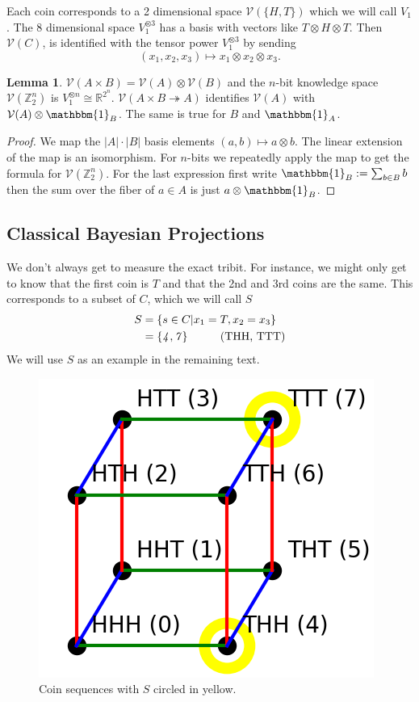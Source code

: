 \documentclass[12pt,a4paper]{article}
\theoremstyle{myrule}
\theoremstyle{postulate}
\theoremstyle{definition}
\newtheorem{lemma}[theorem]{Lemma}
\begin{document}
Each coin corresponds to a 2 dimensional space $\mathcal{V}(\{H,T\})$ which we will call $V_1$.  The 8 dimensional space $V_1 ^ {\otimes 3}$ has a basis with vectors like $T \otimes H \otimes T$.  Then $\mathcal{V}(C)$, is identified with the tensor power $V_1^{\otimes 3}$ by sending
\[
(x_1,x_2,x_3) \mapsto x_1 \otimes x_2 \otimes x_3.
\]

\begin{lemma}
\label{product}
  $\mathcal{V}(A \times B) = \mathcal{V}(A) \otimes \mathcal{V}(B)$ and the $n$-bit knowledge space $\mathcal{V}(\mathbb{Z}_2^n)$ is $V_1 ^ {\otimes n} \cong \mathbb{R}^{2^n}$.  $\mathcal{V}(A \times B \twoheadrightarrow A)$ identifies $\mathcal{V}(A)$ with $\mathcal{V}(A) \otimes \mathbbm{1}_B$.  The same is true for $B$ and $\mathbbm{1}_A$.
\end{lemma}
\begin{proof}
  We map the $|A|\cdot|B|$ basis elements $(a,b) \mapsto a \otimes b$.  The linear extension of the map is an isomorphism.  For $n$-bits we repeatedly apply the map to get the formula for $\mathcal{V}(\mathbb{Z}_2^n)$.  For the last expression first write $\mathbbm{1}_B := \sum_{b \in B} b$ then the sum over the fiber of $a \in A$ is just $a \otimes \mathbbm{1}_B$.
\end{proof}


\subsection{Classical Bayesian Projections}
\label{proj}
We don't always get to measure the exact tribit.  For instance, we might only get to know that the first coin is $T$ and that the 2nd and 3rd coins are the same.  This corresponds to a subset of $C$, which we will call $S$
\[
\begin{split}
  S &= \{s \in C | x_1 = T, x_2 = x_3 \} \\
    & = \{\mathit{4},\mathit{7}\} \hspace{0.4 in} \text{(THH, TTT)}
\end{split}
\]
We will use $S$ as an example in the remaining text.

\begin{figure}[h]
\centering
\includegraphics[scale=0.6]{cube.png}
\caption{Coin sequences with $S$ circled in yellow.}
\label{masslessshell}
\end{figure}
\end{document}
